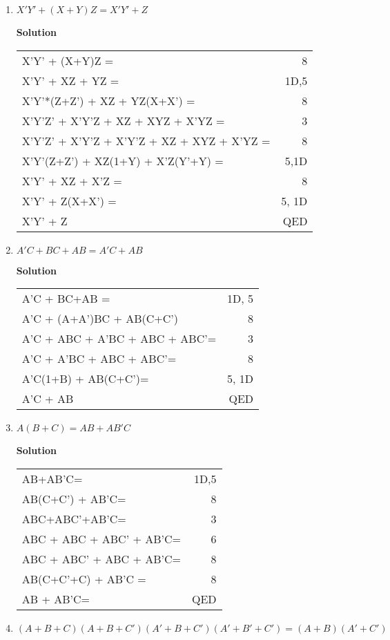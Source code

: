 \begin{enumerate}
\begin{enumerate}
	\item $X'Y' + (X+Y)Z = X'Y' + Z$

\begin{onlysolution}  \textbf{Solution} \itshape

\begin{tabular}{lr}
X'Y' + (X+Y)Z = 				& 8\\
X'Y' + XZ + YZ = 				& 1D,5 \\
X'Y'*(Z+Z') + XZ + YZ(X+X') =  			& 8 \\
X'Y'Z' + X'Y'Z + XZ + XYZ + X'YZ =  		& 3 \\
X'Y'Z' + X'Y'Z + X'Y'Z + XZ + XYZ + X'YZ =  	& 8 \\
X'Y'(Z+Z') + XZ(1+Y) + X'Z(Y'+Y) =  		& 5,1D \\
X'Y' + XZ + X'Z  =  				& 8 \\
X'Y' + Z(X+X') =  				& 5, 1D\\
X'Y' + Z 					& QED \\
\end{tabular} \end{onlysolution}

	\item $A'C+BC+AB = A'C+AB$

\begin{onlysolution}  \textbf{Solution} \itshape

\begin{tabular}{lr}
A'C + BC+AB =  					& 1D, 5 \\
A'C + (A+A')BC + AB(C+C') 			& 8  \\
A'C + ABC + A'BC + ABC + ABC'= 			& 3\\
A'C + A'BC + ABC + ABC'= 			& 8\\
A'C(1+B) + AB(C+C')= 				& 5, 1D\\
A'C + AB 					& QED \\
\end{tabular} \end{onlysolution}
	\item $A(B+C)=AB+AB'C$

\begin{onlysolution}  \textbf{Solution} \itshape

\begin{tabular}{lr}
AB+AB'C= 					& 1D,5\\
AB(C+C') + AB'C= 				& 8 \\
ABC+ABC'+AB'C= 					& 3 \\
ABC + ABC + ABC' + AB'C= 			& 6\\
ABC + ABC' + ABC + AB'C= 			& 8\\
AB(C+C'+C) + AB'C = 				& 8\\	
AB + AB'C= 					& QED\\
\end{tabular}	\end{onlysolution}
	\item $(A+B+C)(A+B+C')(A'+B+C')(A'+B'+C') = (A+B)(A'+C')$


\end{enumerate}
\end{enumerate}
